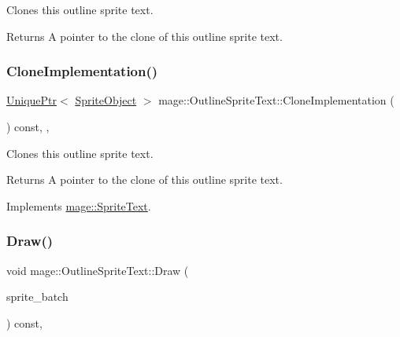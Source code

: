 Clones this outline sprite text.

\begin{DoxyReturn}{Returns}
A pointer to the clone of this outline sprite text. 
\end{DoxyReturn}
\hypertarget{classmage_1_1_outline_sprite_text_af8d29408abb61c05a23499bf37c4c7b0}{}\label{classmage_1_1_outline_sprite_text_af8d29408abb61c05a23499bf37c4c7b0} 
\subsubsection{\texorpdfstring{Clone\+Implementation()}{CloneImplementation()}}
{\footnotesize\ttfamily \hyperlink{namespacemage_a3316d7143a973e37adf1110f2e80ca31}{Unique\+Ptr}$<$ \hyperlink{classmage_1_1_sprite_object}{Sprite\+Object} $>$ mage\+::\+Outline\+Sprite\+Text\+::\+Clone\+Implementation (\begin{DoxyParamCaption}{ }\end{DoxyParamCaption}) const\hspace{0.3cm}{\ttfamily [override]}, {\ttfamily [private]}, {\ttfamily [virtual]}}

Clones this outline sprite text.

\begin{DoxyReturn}{Returns}
A pointer to the clone of this outline sprite text. 
\end{DoxyReturn}


Implements \hyperlink{classmage_1_1_sprite_text_a2b9f59a1730f8b9691f173251a2b4944}{mage\+::\+Sprite\+Text}.

\hypertarget{classmage_1_1_outline_sprite_text_a524e9ad1caeeeaa32405e61d1a5e1032}{}\label{classmage_1_1_outline_sprite_text_a524e9ad1caeeeaa32405e61d1a5e1032} 
\subsubsection{\texorpdfstring{Draw()}{Draw()}}
{\footnotesize\ttfamily void mage\+::\+Outline\+Sprite\+Text\+::\+Draw (\begin{DoxyParamCaption}\item[{Sprite\+Batch \&}]{sprite\+\_\+batch }\end{DoxyParamCaption}) const\hspace{0.3cm}{\ttfamily [override]}, {\ttfamily [virtual]}}

